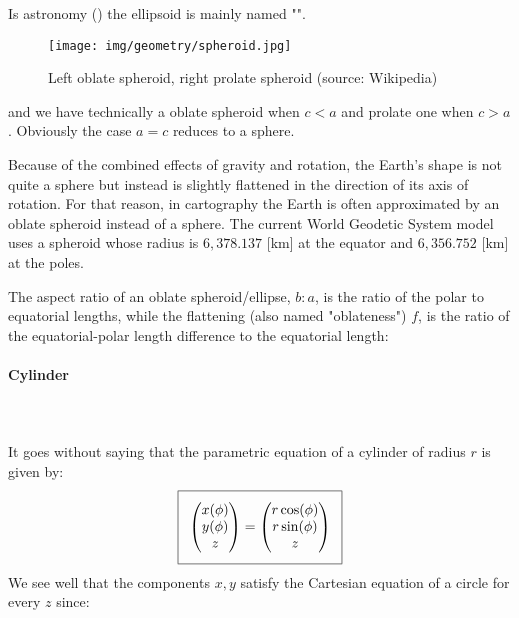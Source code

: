 {	Is astronomy () the ellipsoid is mainly named "".
	\begin{figure}[H]
		\centering
		\texttt{[image: img/geometry/spheroid.jpg]}
		\caption{Left oblate spheroid, right prolate spheroid (source: Wikipedia)}
	\end{figure}
	and we have technically a oblate spheroid when $c<a$ and prolate one when $c>a$. Obviously the case $a = c$ reduces to a sphere.
	
	\begin{tcolorbox}[title=Remark,colframe=black,arc=10pt]
	Because of the combined effects of gravity and rotation, the Earth's shape is not quite a sphere but instead is slightly flattened in the direction of its axis of rotation. For that reason, in cartography the Earth is often approximated by an oblate spheroid instead of a sphere. The current World Geodetic System model uses a spheroid whose radius is $6,378.137$ [km] at the equator and $6,356.752$ [km] at the poles.
	\end{tcolorbox}
	The aspect ratio of an oblate spheroid/ellipse, $b : a$, is the ratio of the polar to equatorial lengths, while the flattening (also named "oblateness") $f$, is the ratio of the equatorial-polar length difference to the equatorial length:
	
	
	\pagebreak
	\paragraph{Cylinder}\mbox{}\\\\
	It goes without saying that the parametric equation of a cylinder of radius $r$ is given by:
	\begin{equation}
	  \addtolength{\fboxsep}{5pt}
	   \boxed{
	   \begin{gathered}
	   		\begin{pmatrix}
	   		x(\phi)\\y(\phi)\\z
	   		\end{pmatrix}=
	   		\begin{pmatrix}
	   		r\cos(\phi)\\r\sin(\phi)\\z
	   		\end{pmatrix}
	   \end{gathered}
	   }
	\end{equation}
	We see well that the components $x, y$ satisfy the Cartesian equation of a circle for every $z$ since:
	
}
